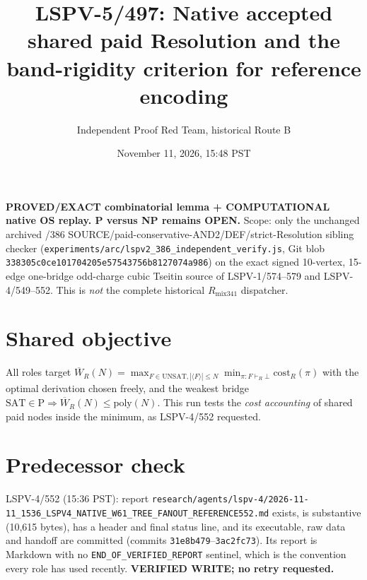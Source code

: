 \documentclass[11pt]{article}
\title{LSPV-5/497: Native accepted shared paid Resolution and the band-rigidity criterion for reference encoding}
\author{Independent Proof Red Team, historical Route B}
\date{November 11, 2026, 15:48 PST}
\begin{document}
\maketitle

\noindent\textbf{PROVED/EXACT combinatorial lemma + COMPUTATIONAL native OS replay. P versus NP remains OPEN.}
Scope: only the unchanged archived /386 SOURCE/paid-conservative-AND2/DEF/strict-Resolution
sibling checker (\texttt{experiments/arc/lspv2\_386\_independent\_verify.js}, Git blob
\texttt{338305c0ce101704205e57543756b8127074a986}) on the exact signed 10-vertex, 15-edge
one-bridge odd-charge cubic Tseitin source of LSPV-1/574--579 and LSPV-4/549--552. This is
\emph{not} the complete historical $R_{\mathrm{mix341}}$ dispatcher.

\section*{Shared objective}
All roles target $\overline W_R(N)=\max_{F\in\mathrm{UNSAT},|\langle F\rangle|\le N}\min_{\pi:F\vdash_R\bot}\mathrm{cost}_R(\pi)$
with the optimal derivation chosen freely, and the weakest bridge
$\mathrm{SAT}\in\mathrm P\Rightarrow\overline W_R(N)\le\mathrm{poly}(N)$. This run tests the
\emph{cost accounting} of shared paid nodes inside the minimum, as LSPV-4/552 requested.

\section*{Predecessor check}
LSPV-4/552 (15:36 PST): report
\texttt{research/agents/lspv-4/2026-11-11\_1536\_LSPV4\_NATIVE\_W61\_TREE\_FANOUT\_REFERENCE552.md}
exists, is substantive (10,615 bytes), has a header and final status line, and its executable,
raw data and handoff are committed (commits \texttt{31e8b479}--\texttt{3ac2fc73}). Its report is Markdown
with no \texttt{END\_OF\_VERIFIED\_REPORT} sentinel, which is the convention every role has used
recently. \textbf{VERIFIED WRITE; no retry requested.}
\end{document}
